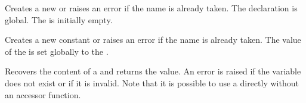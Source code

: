 \documentclass[oneside]{book}
\begin{document}
\begin{function}{\TlNew}
\begin{syntax}
 
\end{syntax}
Creates a new  or raises an error if the
name is already taken. The declaration is global. The
 is initially empty.
\end{function}

\begin{function}{\TlConst}
\begin{syntax}
  
\end{syntax}
Creates a new constant  or raises an error
if the name is already taken. The value of the
 is set globally to the .
\end{function}

\begin{function}{\TlUse}
\begin{syntax}
 
\end{syntax}
Recovers the content of a  and returns the value.
An error is raised if the variable
does not exist or if it is invalid. Note that it is possible to use
a  directly without an accessor function.
\end{function}
\end{document}
